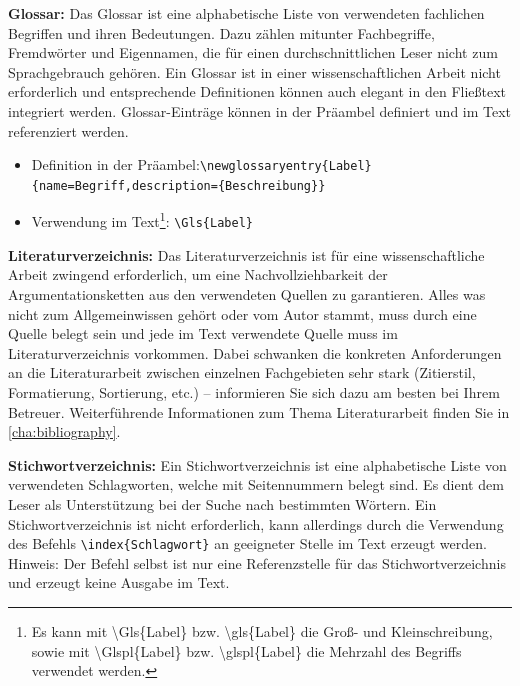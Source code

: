 	\textbf{Glossar:}\label{itm:glossary}
	Das Glossar ist eine alphabetische Liste von verwendeten fachlichen Begriffen und ihren Bedeutungen.
	Dazu zählen mitunter Fachbegriffe, Fremdwörter und Eigennamen, die für einen durchschnittlichen Leser nicht zum Sprachgebrauch gehören.
	Ein Glossar ist in einer wissenschaftlichen Arbeit nicht erforderlich und entsprechende Definitionen können auch elegant in den Fließtext integriert werden.
	Glossar-Einträge können in der Präambel definiert und im Text referenziert werden.
	\begin{itemize}
		\item Definition in der Präambel:\newline\verb|\newglossaryentry{Label}{name=Begriff,description={Beschreibung}}|
		\item Verwendung im Text\footnote{\label{ftn:glossaryCommands}Es kann mit \textbackslash{}Gls\{Label\} bzw. \textbackslash{}gls\{Label\} die Groß- und Kleinschreibung, sowie mit \textbackslash{}Glspl\{Label\} bzw. \textbackslash{}glspl\{Label\} die Mehrzahl des Begriffs verwendet werden.}: \verb|\Gls{Label}|
	\end{itemize}
	
	\textbf{Literaturverzeichnis:}\label{itm:bibliography}
	Das Literaturverzeichnis ist für eine wissenschaftliche Arbeit zwingend erforderlich, um eine Nachvollziehbarkeit der Argumentationsketten aus den verwendeten Quellen zu garantieren.
	Alles was nicht zum Allgemeinwissen gehört oder vom Autor stammt, muss durch eine Quelle belegt sein und jede im Text verwendete Quelle muss im Literaturverzeichnis vorkommen.
	Dabei schwanken die konkreten Anforderungen an die Literaturarbeit zwischen einzelnen Fachgebieten sehr stark (Zitierstil, Formatierung, Sortierung, etc.) -- informieren Sie sich dazu am besten bei Ihrem Betreuer.
	Weiterführende Informationen zum Thema Literaturarbeit finden Sie in \cref{cha:bibliography}.
	
	\textbf{Stichwortverzeichnis:}\label{itm:index}
	Ein Stichwortverzeichnis ist eine alphabetische Liste von verwendeten Schlagworten, welche mit Seitennummern belegt sind.
	Es dient dem Leser als Unterstützung bei der Suche nach bestimmten Wörtern.
	Ein Stichwortverzeichnis ist nicht erforderlich, kann allerdings durch die Verwendung des Befehls \verb|\index{Schlagwort}| an geeigneter Stelle im Text erzeugt werden.
	Hinweis: Der Befehl selbst ist nur eine Referenzstelle für das Stichwortverzeichnis und erzeugt keine Ausgabe im Text.
	
